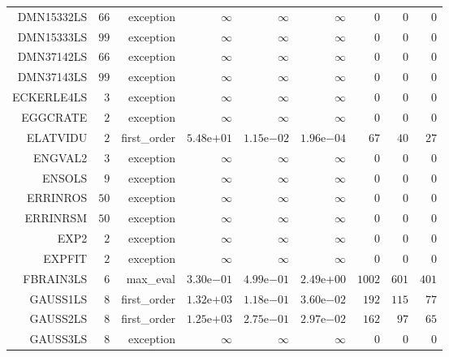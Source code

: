 \begin{longtable}{rrrrrrrrr}
DMN15332LS & \(    66\) & exception & \(\infty\) & \(\infty\) & \(\infty\) & \(     0\) & \(     0\) & \(     0\) \\
DMN15333LS & \(    99\) & exception & \(\infty\) & \(\infty\) & \(\infty\) & \(     0\) & \(     0\) & \(     0\) \\
DMN37142LS & \(    66\) & exception & \(\infty\) & \(\infty\) & \(\infty\) & \(     0\) & \(     0\) & \(     0\) \\
DMN37143LS & \(    99\) & exception & \(\infty\) & \(\infty\) & \(\infty\) & \(     0\) & \(     0\) & \(     0\) \\
ECKERLE4LS & \(     3\) & exception & \(\infty\) & \(\infty\) & \(\infty\) & \(     0\) & \(     0\) & \(     0\) \\
EGGCRATE & \(     2\) & exception & \(\infty\) & \(\infty\) & \(\infty\) & \(     0\) & \(     0\) & \(     0\) \\
ELATVIDU & \(     2\) & first\_order & \( 5.48\)e\(+01\) & \( 1.15\)e\(-02\) & \( 1.96\)e\(-04\) & \(    67\) & \(    40\) & \(    27\) \\
ENGVAL2 & \(     3\) & exception & \(\infty\) & \(\infty\) & \(\infty\) & \(     0\) & \(     0\) & \(     0\) \\
ENSOLS & \(     9\) & exception & \(\infty\) & \(\infty\) & \(\infty\) & \(     0\) & \(     0\) & \(     0\) \\
ERRINROS & \(    50\) & exception & \(\infty\) & \(\infty\) & \(\infty\) & \(     0\) & \(     0\) & \(     0\) \\
ERRINRSM & \(    50\) & exception & \(\infty\) & \(\infty\) & \(\infty\) & \(     0\) & \(     0\) & \(     0\) \\
EXP2 & \(     2\) & exception & \(\infty\) & \(\infty\) & \(\infty\) & \(     0\) & \(     0\) & \(     0\) \\
EXPFIT & \(     2\) & exception & \(\infty\) & \(\infty\) & \(\infty\) & \(     0\) & \(     0\) & \(     0\) \\
FBRAIN3LS & \(     6\) & max\_eval & \( 3.30\)e\(-01\) & \( 4.99\)e\(-01\) & \( 2.49\)e\(+00\) & \(  1002\) & \(   601\) & \(   401\) \\
GAUSS1LS & \(     8\) & first\_order & \( 1.32\)e\(+03\) & \( 1.18\)e\(-01\) & \( 3.60\)e\(-02\) & \(   192\) & \(   115\) & \(    77\) \\
GAUSS2LS & \(     8\) & first\_order & \( 1.25\)e\(+03\) & \( 2.75\)e\(-01\) & \( 2.97\)e\(-02\) & \(   162\) & \(    97\) & \(    65\) \\
GAUSS3LS & \(     8\) & exception & \(\infty\) & \(\infty\) & \(\infty\) & \(     0\) & \(     0\) & \(     0\) \\

\end{longtable}

